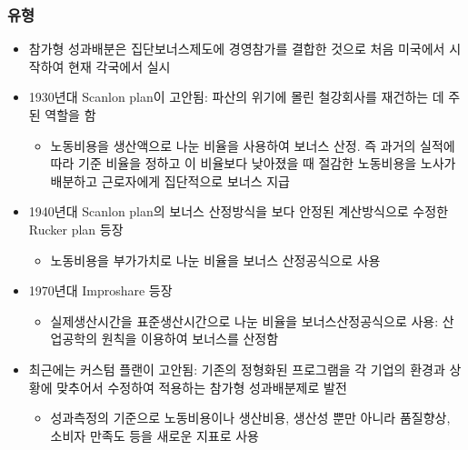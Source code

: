 \documentclass[aspectratio=169,xcolor=dvipsnames,handout]{beamer}
\begin{document}
\begin{frame}[allowframebreaks]
    \frametitle{유형}
    \begin{itemize}[<+->]
        \item 참가형 성과배분은 집단보너스제도에 경영참가를 결합한 것으로 처음 미국에서 시작하여 현재 각국에서 실시
        \item 1930년대 Scanlon plan이 고안됨: 파산의 위기에 몰린 철강회사를 재건하는 데 주된 역할을 함
        \begin{itemize}[<+->]
            \item 노동비용을 생산액으로 나눈 비율을 사용하여 보너스 산정. 즉 과거의 실적에 따라 기준 비율을 정하고 이 비율보다 낮아졌을 때 절감한 노동비용을 노사가 배분하고 근로자에게 집단적으로 보너스 지급
        \end{itemize}
        \item 1940년대 Scanlon plan의 보너스 산정방식을 보다 안정된 계산방식으로 수정한 Rucker plan 등장
        \begin{itemize}[<+->]
            \item 노동비용을 부가가치로 나눈 비율을 보너스 산정공식으로 사용
        \end{itemize}
        \item 1970년대 Improshare 등장
        \begin{itemize}[<+->]
            \item 실제생산시간을 표준생산시간으로 나눈 비율을 보너스산정공식으로 사용: 산업공학의 원칙을 이용하여 보너스를 산정함
        \end{itemize}
        \item 최근에는 커스텀 플랜이 고안됨: 기존의 정형화된 프로그램을 각 기업의 환경과 상황에 맞추어서 수정하여 적용하는 참가형 성과배분제로 발전 
        \begin{itemize}[<+->]
            \item 성과측정의 기준으로 노동비용이나 생산비용, 생산성 뿐만 아니라 품질향상, 소비자 만족도 등을 새로운 지표로 사용
        \end{itemize}
    \end{itemize}
\end{frame}
\end{document}
